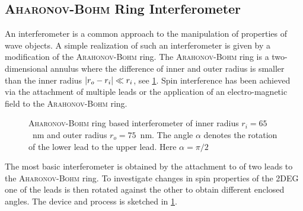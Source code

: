 \subsection{\textsc{Aharonov-Bohm} Ring Interferometer}
An interferometer is a common approach to the manipulation of properties of wave objects. A simple realization of such an interferometer is given by a modification of the \textsc{Arahonov-Bohm} ring. The \textsc{Arahonov-Bohm} ring is a two-dimensional annulus where the difference of inner and outer radius is smaller than the inner radius $\lvert r_o- r_i\rvert \ll r_i$, see \cref{fig:aharonovbohmring}.
Spin interference has been achieved via the attachment of multiple leads \cite{PhysRevB.75.035304} or the application of an electro-magnetic field \cite{PhysRevB.69.155335} to the \textsc{Arahonov-Bohm} ring.\par
\begin{figure}[!h]
\centering
{}
\caption{\textsc{Aharonov-Bohm} ring based interferometer of inner radius $r_i=65$~nm and outer radius $r_o=75$~nm. The angle $\alpha$ denotes the rotation of the lower lead to the upper lead. Here $\alpha=\pi/2$}\label{fig:aharonovbohmring}
\end{figure}
The most basic interferometer is obtained by the attachment to of two leads to the \textsc{Aharonov-Bohm} ring. To investigate changes in spin properties of the 2DEG one of the leads is then rotated against the other to obtain different enclosed angles. The device and process is sketched in \cref{fig:aharonovbohmring}.
